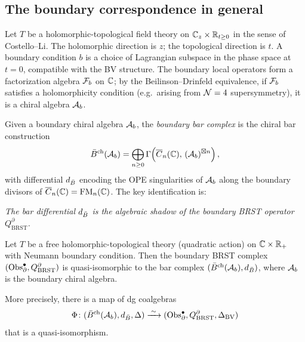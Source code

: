 \subsection{The boundary correspondence in general}

\begin{setup}
Let $T$ be a holomorphic-topological field theory on $\mathbb{C}_z \times \mathbb{R}_{t \geq 0}$
in the sense of Costello--Li. The holomorphic direction is $z$; the
topological direction is $t$. A boundary condition $b$ is a choice of
Lagrangian subspace in the phase space at $t = 0$, compatible with the
BV structure. The boundary local operators form a factorization algebra
$\mathcal{F}_b$ on $\mathbb{C}$; by the Beilinson--Drinfeld equivalence, if $\mathcal{F}_b$
satisfies a holomorphicity condition (e.g.\ arising from $\mathcal{N} = 4$
supersymmetry), it is a chiral algebra $\mathcal{A}_b$.
\end{setup}

\begin{definition}
Given a boundary chiral algebra $\mathcal{A}_b$, the \emph{boundary bar complex}
is the chiral bar construction
\[
\bar{B}^{\mathrm{ch}}(\mathcal{A}_b) = \bigoplus_{n \geq 0}
 \Gamma\!\left(\overline{C}_n(\mathbb{C}),\, (\mathcal{A}_b)^{\boxtimes n}\right),
\]
with differential $d_{\bar{B}}$ encoding the OPE singularities of $\mathcal{A}_b$
along the boundary divisors of $\overline{C}_n(\mathbb{C}) = \operatorname{FM}_n(\mathbb{C})$. The key
identification is:

\emph{The bar differential $d_{\bar{B}}$ is the algebraic shadow of the
boundary BRST operator $Q_{\mathrm{BRST}}^{\partial}$.}
\end{definition}

\begin{proposition}
Let $T$ be a free holomorphic-topological theory (quadratic action) on
$\mathbb{C} \times \mathbb{R}_+$ with Neumann boundary condition. Then the boundary
BRST complex $(\operatorname{Obs}^\bullet_\partial, Q_{\mathrm{BRST}}^\partial)$ is
quasi-isomorphic to the bar complex $(\bar{B}^{\mathrm{ch}}(\mathcal{A}_b), d_{\bar{B}})$,
where $\mathcal{A}_b$ is the boundary chiral algebra.

More precisely, there is a map of dg coalgebras
\[
\Phi \colon (\bar{B}^{\mathrm{ch}}(\mathcal{A}_b), d_{\bar{B}}, \Delta)
 \xrightarrow{\;\sim\;}
 (\operatorname{Obs}^\bullet_\partial, Q_{\mathrm{BRST}}^\partial, \Delta_{\mathrm{BV}})
\]
that is a quasi-isomorphism.
\end{proposition}

